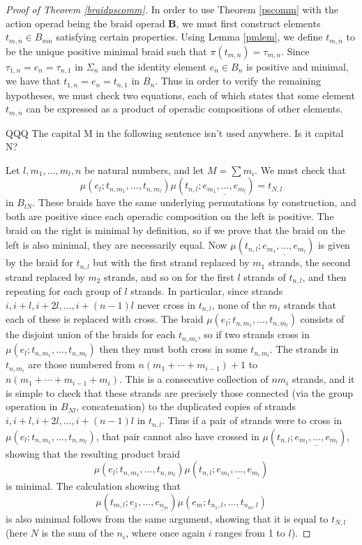 \documentclass{amsbook} %
\newcommand{\mb}{\mathbf}
\numberwithin{section}{chapter}
\begin{document}
\begin{proof}[Proof of Theorem \ref{braidpscomm}]
In order to use Theorem \ref{pscomm} with the action operad being the braid operad $\mb{B}$, we must first construct elements $t_{m,n} \in B_{mn}$ satisfying certain properties.  Using Lemma \ref{pmlem}, we define $t_{m,n}$ to be the unique positive minimal braid such that $\pi(t_{m,n}) = \tau_{m,n}$.  Since $\tau_{1,n} = e_{n} = \tau_{n,1}$ in $\Sigma_{n}$ and the identity element $e_{n} \in B_{n}$ is positive and minimal, we have that $t_{1,n} = e_{n} = t_{n,1}$ in $B_{n}$.  Thus in order to verify the remaining hypotheses, we must check two equations, each of which states that some element $t_{m,n}$ can be expressed as a product of operadic compositions of other elements.

QQQ The capital M in the following sentence isn't used anywhere. Is it capital N?

Let $l, m_{1}, \ldots, m_{l}, n$ be natural numbers, and let $M = \sum m_{i}$.  We must check that
  \[
    \mu(e_{l}; t_{n, m_{1}}, \ldots, t_{n, m_{l}}) \mu\left(t_{n,l}; \underline{e_{m_{1}}, \ldots, e_{m_{l}}}\right) = t_{N, l}
  \]
in $B_{lN}$.  These braids have the same underlying permutations by construction, and both are positive since each operadic composition on the left is positive.  The braid on the right is minimal by definition, so if we prove that the braid on the left is also minimal, they are necessarily equal.  Now $\mu\left(t_{n,l}; \underline{e_{m_{1}}, \ldots, e_{m_{l}}}\right)$ is given by the braid for $t_{n,l}$ but with the first strand replaced by $m_{1}$ strands, the second strand replaced by $m_{2}$ strands, and so on for the first $l$ strands of $t_{n,l}$, and then repeating for each group of $l$ strands.  In particular, since strands $i, i+l, i+2l, \ldots, i + (n-1)l$ never cross in $t_{n,l}$, none of the $m_{i}$ strands that each of these is replaced with cross.  The braid $\mu(e_{l}; t_{n, m_{1}}, \ldots, t_{n, m_{l}})$ consists of the disjoint union of the braids for each $t_{n,m_{i}}$, so if two strands cross in $\mu(e_{l}; t_{n, m_{1}}, \ldots, t_{n, m_{l}})$ then they must both cross in some $t_{n,m_{i}}$.  The strands in $t_{n,m_{i}}$ are those numbered from $n(m_{1} + \cdots + m_{i-1}) + 1$ to $n(m_{1} + \cdots + m_{i-1} + m_{i})$.  This is a consecutive collection of $nm_{i}$ strands, and it is simple to check that these strands are precisely those connected (via the group operation in $B_{Nl}$, concatenation) to the duplicated copies of strands $i, i+l, i+2l, \ldots, i + (n-1)l$ in $t_{n,l}$.  Thus if a pair of strands were to cross in $\mu(e_{l}; t_{n, m_{1}}, \ldots, t_{n, m_{l}})$, that pair cannot also have crossed in $\mu\left(t_{n,l}; \underline{e_{m_{1}}, \ldots, e_{m_{l}}}\right)$, showing that the resulting product braid
  \[
    \mu(e_{l}; t_{n, m_{1}}, \ldots, t_{n, m_{l}}) \mu\left(t_{n,l}; \underline{e_{m_{1}}, \ldots, e_{m_{l}}}\right)
  \]
is minimal.  The calculation showing that
  \[
    \mu\left(t_{m,l}; \underline{e_{1}}, \ldots, \underline{e_{n_{m}}}\right) \mu\left(e_{m}; t_{n_{1}, l}, \ldots, t_{n_{m}, l}\right)
  \]
is also minimal follows from the same argument, showing that it is equal to $t_{N, l}$ (here $N$ is the sum of the $n_{i}$, where once again $i$ ranges from 1 to $l$).


\end{proof}
\end{document}
